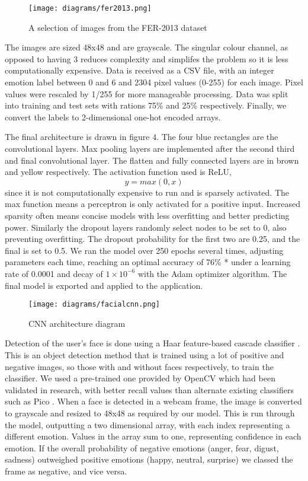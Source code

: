 \documentclass[12pt,a4paper]{article}
\begin{document}
\begin{figure}[h]
	\centerline{\texttt{[image: diagrams/fer2013.png]}}
	\caption{A selection of images from the FER-2013 dataset}
\end{figure}

The images are sized 48x48 and are grayscale. The singular colour channel, as opposed to having 3 reduces complexity and simplifes the problem so it is less computationally expensive. Data is received as a CSV file, with an integer emotion label between 0 and 6 and 2304 pixel values (0-255) for each image. Pixel values were rescaled by 1/255 for more manageable processing. Data was split into training and test sets with rations 75\% and 25\% respectively. Finally, we convert the labels to 2-dimensional one-hot encoded arrays.

The final architecture is drawn in figure 4. The four blue rectangles are the convolutional layers. Max pooling layers are implemented after the second third and final convolutional layer. The flatten and fully connected layers are in brown and yellow respectively. The activation function used is ReLU, \[ y = max(0,x) \] since it is not computationally expensive to run and is sparsely activated. The max function means a perceptron is only activated for a positive input. Increased sparsity often means concise models with less overfitting and better predicting power. Similarly the dropout layers randomly select nodes to be set to 0, also preventing overfitting. The dropout probability for the first two are 0.25, and the final is set to 0.5. We ran the model over 250 epochs several times, adjusting parameters each time, reaching an optimal accuracy of 76\% * under a learning rate of 0.0001 and decay of $1 \times 10^{-6}$ with the Adam optimizer algorithm. The final model is exported and applied to the application.

\begin{figure}[h]
	\centerline{\texttt{[image: diagrams/facialcnn.png]}}
	\caption{CNN architecture diagram}
\end{figure}


Detection of the user's face is done using a Haar feature-based cascade classifier \cite{viola2001rapid}. This is an object detection method that is trained using a lot of positive and negative images, so those with and without faces respectively, to train the classifier. We used a pre-trained one provided by OpenCV which had been validated in research, with better recall values than alternate existing classifiers such as Pico \cite{kalinovskii2015compact}. When a face is detected in a webcam frame, the image is converted to grayscale and resized to 48x48 as required by our model. This is run through the model, outputting a two dimensional array, with each index representing a different emotion. Values in the array sum to one, representing confidence in each emotion. If the overall probability of negative emotions (anger, fear, digust, sadness) outweighed positive emotions (happy, neutral, surprise) we classed the frame as negative, and vice versa. 
\end{document}
